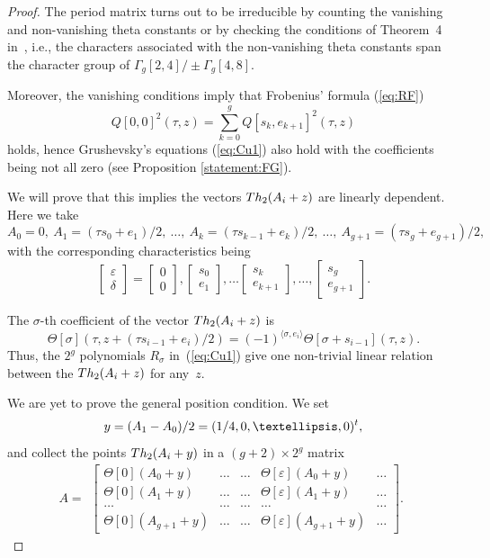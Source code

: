 \documentclass[11pt]{article}
\numberwithin{equation}{section}
\numberwithin{equation}{section}
\newcommand{\de}{\delta}
\newcommand{\ep}{\varepsilon}
\def\s{\sigma}
\def\T{\Theta}
\begin{document}
\begin{proof}The period matrix turns out to be irreducible by counting the vanishing and non-vanishing theta constants or by checking the conditions of Theorem~4 in~\cite{SM}, i.e., the characters associated with the non-vanishing theta constants span the character group of
 $\Gamma_g[2,4]/\pm \Gamma_g[4,8]$.

Moreover, the vanishing conditions imply that Frobenius' formula (\ref{eq:RF})
\[
 Q[0, 0]^2 (\tau, z)=\sum_{k=0}^g Q[s_k, e_{k+1}]^2(\tau, z)
\]
 holds, hence Grushevsky's equations
 (\ref{eq:Cu1}) also hold with the coefficients being not all zero (see Proposition \ref{statement:FG}).

 We will prove that this implies the vectors ${\rm Th}_2(A_i + z) $ are linearly dependent.
 Here we take
 \[
A_0=0, \ A_1=(\tau s_0 + e_1)/2, \ \dots, \ A_k= (\tau s_{k-1} + e_k)/2, \ \dots, \ A_{g+1}= (\tau s_{g} + e_{g+1})/2,
\]
 with the corresponding characteristics being
\[
\begin{bmatrix} \ep \\ \de\end{bmatrix} =\begin{bmatrix} 0 \\ 0 \end{bmatrix} ,\begin{bmatrix} s_0 \\ e_{1}\end{bmatrix}, \dots\begin{bmatrix} s_k \\ e_{k+1} \end{bmatrix},\dots,\begin{bmatrix} s_g \\ e_{g+1} \end{bmatrix}.
\]

The $\s$-th coefficient of the vector ${\rm Th}_2(A_i + z)$ is
\[
\T[\s](\tau, z+(\tau s_{i-1} + e_i)/2)= (-1)^{\langle \s, e_i\rangle}\T[\s+s_{i-1}](\tau, z).
\]
Thus, the $2^g$ polynomials $R_\s$ in~(\ref{eq:Cu1}) give one non-trivial linear relation between the ${\rm Th}_2(A_i + z)$ for any~$z$.

We are yet to prove the general position condition. We set
\[
y=(A_1-A_0)/2= (1/4,0,\dots , 0)^{\rm t},
\]
and collect the points ${\rm Th}_2(A_i+y)$ in a $(g+2)\times 2^g$ matrix
\[
A=
 \begin{array}{ccccc}
 \begin{bmatrix} \T[0](A_0+y)&\dots&\dots& \T[\ep] (A_0+y)&\dots\\
\T[0](A_1+y)&\dots&\dots& \T[\ep] (A_1+y)&\dots\\
\dots&\dots&\dots&\dots&\dots\\
\T[0](A_{g+1}+y)&\dots&\dots& \T[\ep] (A_{g+1}+y)&\dots
 \end{bmatrix}.
 \end{array}
\]


\end{proof}
\end{document}
